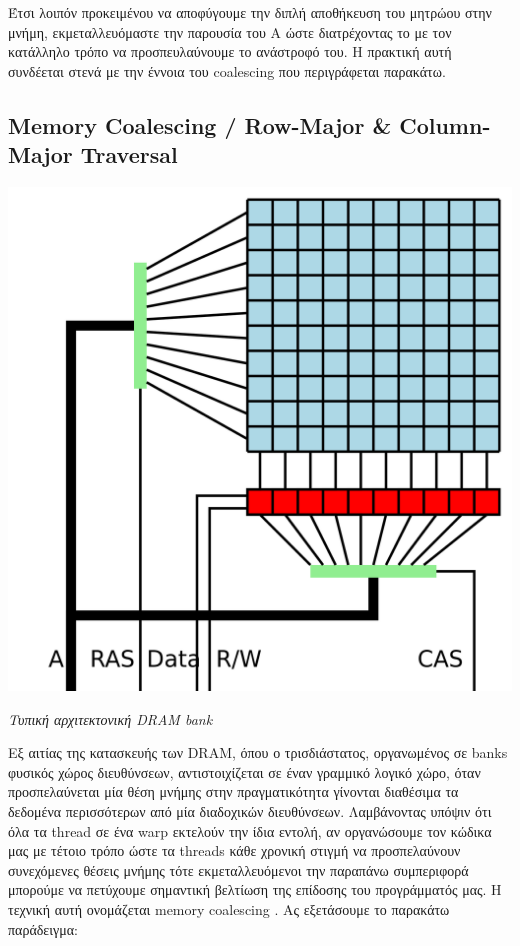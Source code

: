 Έτσι λοιπόν προκειμένου να αποφύγουμε την διπλή αποθήκευση του μητρώου στην μνήμη, εκμεταλλευόμαστε την παρουσία του Α ώστε διατρέχοντας το με τον κατάλληλο τρόπο να προσπευλαύνουμε το ανάστροφό του. Η πρακτική αυτή συνδέεται στενά με την έννοια του coalescing που περιγράφεται παρακάτω.



\subsection*{Memory Coalescing / Row-Major \& Column-Major Traversal}


\begin{center}
    \includegraphics[scale=0.1]{./figures/2_tnv/DRAM}
    
    {\small \textit{Τυπική αρχιτεκτονική DRAM bank}}
\end{center}

Εξ αιτίας της κατασκευής των DRAM, όπου ο τρισδιάστατος, οργανωμένος σε banks φυσικός χώρος διευθύνσεων, αντιστοιχίζεται σε έναν γραμμικό λογικό χώρο, όταν προσπελαύνεται μία θέση μνήμης στην πραγματικότητα γίνονται διαθέσιμα τα δεδομένα περισσότερων από μία διαδοχικών διευθύνσεων.
Λαμβάνοντας υπόψιν ότι όλα τα thread σε ένα warp εκτελούν την ίδια εντολή, αν οργανώσουμε τον κώδικα μας με τέτοιο τρόπο ώστε τα threads κάθε χρονική στιγμή να προσπελαύνουν συνεχόμενες θέσεις μνήμης τότε εκμεταλλευόμενοι την παραπάνω συμπεριφορά μπορούμε να πετύχουμε σημαντική βελτίωση της επίδοσης του προγράμματός μας. Η τεχνική αυτή ονομάζεται memory coalescing \cite{Harris:coal}. Ας εξετάσουμε το παρακάτω παράδειγμα:


